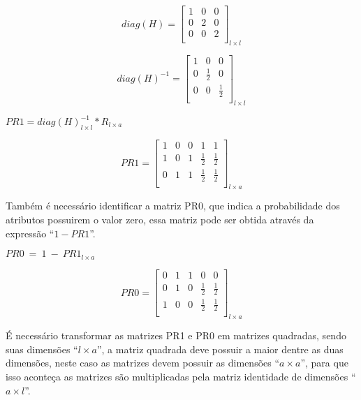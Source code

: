 \begin{anexosenv}
$$diag(H)=\left[
\begin{array}{ccc}
1 & 0 & 0 \\
0 & 2 & 0 \\
0 & 0 & 2 \\
\end{array}
\right]_{l \times l}$$

$$diag(H)^{-1}=\left[
\begin{array}{ccc}
1 & 0 & 0 \\
0 & \frac{1}{2} & 0 \\
0 & 0 & \frac{1}{2} \\
\end{array}
\right]_{l \times l}$$

\begin{center}
$PR1 = diag(H)^{-1}_{l \times l} * R_{l \times a}$
\end{center}

$$PR1=\left[
\begin{array}{ccccc}
1 & 0 & 0 & 1 & 1 \\
1 & 0 & 1 & \frac{1}{2} & \frac{1}{2} \\
0 & 1 & 1 & \frac{1}{2} & \frac{1}{2} \\
\end{array}
\right]_{l \times a}$$

Também é necessário identificar a matriz PR0, que indica a probabilidade dos
atributos possuirem o valor zero, essa matriz pode ser obtida através da
expressão ``$1 - PR1$''.

\begin{center}
$PR0 \ = \ 1 \ - \ PR1_{l \times a}$
\end{center}

$$PR0=\left[
\begin{array}{ccccc}
0 & 1 & 1 & 0 & 0 \\
0 & 1 & 0 & \frac{1}{2} & \frac{1}{2} \\
1 & 0 & 0 & \frac{1}{2} & \frac{1}{2} \\
\end{array}
\right]_{l \times a}$$

É necessário transformar as matrizes PR1 e PR0 em matrizes quadradas,
sendo suas dimensões ``${l \times a}$'', a matriz quadrada deve possuir
a maior dentre as duas dimensões, neste caso as matrizes devem possuir
as dimensões ``${a \times a}$'', para que isso aconteça as matrizes são
multiplicadas pela matriz identidade de dimensões ``${a \times l}$''.


\end{anexosenv}

